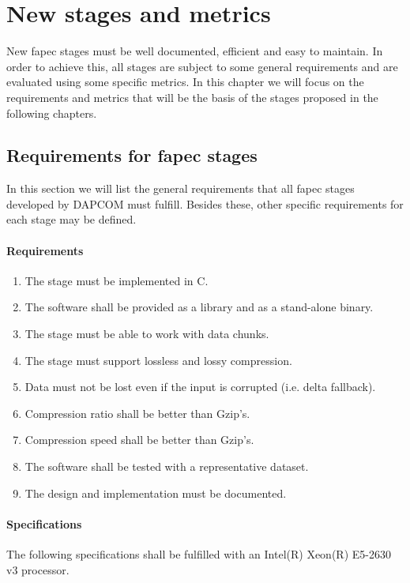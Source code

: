 \chapter{New stages and metrics}
New \acrshort{fapec} stages must be well documented, efficient and easy to maintain. In order to achieve this, all stages are subject to some general requirements and are evaluated using some specific metrics. In this chapter we will focus on the requirements and metrics that will be the basis of the stages proposed in the following chapters.

\section{Requirements for \acrshort{fapec} stages} \label{sec:fapec_reqs}
In this section we will list the general requirements that all \acrshort{fapec} stages developed by DAPCOM must fulfill. Besides these, other specific requirements for each stage may be defined.

\subsubsection{Requirements}
\begin{enumerate}
	\item The stage must be implemented in C. \label{req:c}
	\item The software shall be provided as a library and as a stand-alone binary. \label{req:lib_bin}
	\item The stage must be able to work with data chunks. \label{req:chunks}
	\item The stage must support lossless and lossy compression.
	\item Data must not be lost even if the input is corrupted (i.e. delta fallback).
	\item Compression ratio shall be better than Gzip's.
	\item Compression speed shall be better than Gzip's.
	\item The software shall be tested with a representative dataset.
	\item The design and implementation must be documented.
\end{enumerate}

\subsubsection{Specifications}
The following specifications shall be fulfilled with an Intel(R) Xeon(R) E5-2630 v3 processor.

